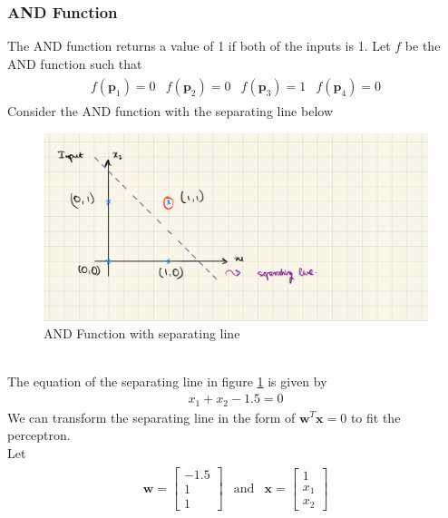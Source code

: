 \subsubsection*{AND Function}
The AND function returns a value of 1 if both of the inputs is 1. Let $f$ be the AND function such that
\begin{align}
\begin{matrix}
  \nonumber
  f(\textbf{p}_1) = 0 & f(\textbf{p}_2) = 0 & f(\textbf{p}_3) = 1 & f(\textbf{p}_4) = 0
\end{matrix}  
\end{align}
Consider the AND function with the separating line below
\begin{figure}[ht]
  \centering
  \includegraphics[scale=0.15]{CHAPTER_2/c2_fig_AND_function.jpeg}
  \caption{AND Function with separating line}
  \label{AND_function_2}
\end{figure}\\
The equation of the separating line in figure \ref{AND_function_2} is given by
\begin{align}
  x_1 + x_2 -1.5 = 0
\end{align}
We can transform the separating line in the form of $\textbf{w}^T\textbf{x} = 0$ to fit the perceptron.\\
Let 
\begin{align}
  \begin{matrix}
    \textbf{w} = \begin{bmatrix}
      -1.5 \\
      1 \\
      1
    \end{bmatrix} & \text{and} & \textbf{x} = \begin{bmatrix}
      1 \\
      x_1 \\
      x_2
    \end{bmatrix}
  \end{matrix}
\end{align}
